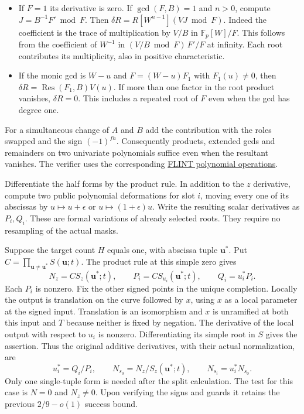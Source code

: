 \documentclass[11pt]{article}
\newcommand{\F}{\mathbb F}
\newcommand{\Res}{\operatorname{Res}}
\begin{document}
\begin{itemize}
\item If $F=1$ its derivative is zero. If $\gcd(F,B)=1$ and
$n>0$, compute $J=B^{-1}F'\bmod F$. Then
$\delta R=R[W^{n-1}](VJ\bmod F)$.
Indeed the coefficient is the trace of multiplication by $V/B$
in $\F_p[W]/F$. This follows from the coefficient of $W^{-1}$
in $(V/B\bmod F)\,F'/F$ at infinity. Each root contributes its
multiplicity, also in positive characteristic.
\item If the monic gcd is $W-u$ and $F=(W-u)F_1$ with
$F_1(u)\ne0$, then $\delta R=\Res(F_1,B)V(u)$. If more than
one factor in the root product vanishes, $\delta R=0$. This
includes a repeated root of $F$ even when the gcd has degree one.
\end{itemize}

For a simultaneous change of $A$ and $B$ add the contribution with
the roles swapped and the sign $(-1)^{fh}$. Consequently products,
extended gcds and remainders on two univariate polynomials suffice
even when the resultant vanishes. The verifier uses the corresponding
\href{https://flintlib.org/doc/algorithms/polynomials/gcd.html}{FLINT polynomial operations}.

Differentiate the half forms by the product rule. In addition to the
$z$ derivative, compute two public polynomial deformations for slot
$i$, moving every one of its abscissas by $u\mapsto u+\epsilon$ or
$u\mapsto(1+\epsilon)u$. Write the resulting scalar derivatives as
$P_i,Q_i$. These are formal variations of already selected roots.
They require no resampling of the actual masks.

Suppose the target count $H$ equals one, with abscissa tuple
$\mathbf u^*$. Put $C=\prod_{\mathbf u\ne\mathbf u^*}S(\mathbf u;t)$.
The product rule at this simple zero gives
\[
  N_z=C S_z(\mathbf u^*;t),\qquad
  P_i=C S_{u_i}(\mathbf u^*;t),\qquad Q_i=u_i^*P_i .
\]
Each $P_i$ is nonzero. Fix the other signed points in the unique
completion. Locally the output is translation on the curve followed
by $x$, using $x$ as a local parameter at the signed input.
Translation is an isomorphism and $x$ is unramified at both this
input and $T$ because neither is fixed by negation. The derivative
of the local output with respect to $u_i$ is nonzero. Differentiating
its simple root in $S$ gives the assertion. Thus the original
additive derivatives, with their actual normalization, are
\[
 u_i^*=Q_i/P_i,\qquad N_{s_0}=N_z/S_z(\mathbf u^*;t),
       \qquad N_{s_i}=u_i^* N_{s_0}.
\]
Only one single-tuple form is needed after the split calculation.
The test for this case is $N=0$ and $N_z\ne0$. Upon verifying the
signs and guards it retains the previous $2/9-o(1)$ success bound.
\end{document}
